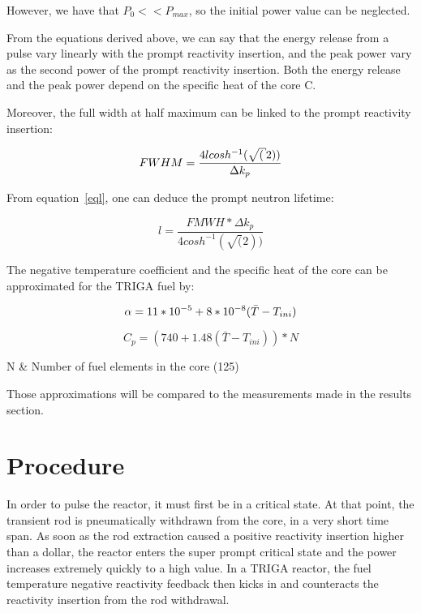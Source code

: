 However, we have that $P_0 << P_{max}$, so the initial power value can be neglected.

From the equations derived above, we can say that the energy release from a pulse vary linearly with the prompt reactivity insertion, and the peak power vary as the second power of the prompt reactivity insertion. Both the energy release and the peak power depend on the specific heat of the core C.

Moreover, the full width at half maximum can be linked to the prompt reactivity insertion:

\begin{equation}{\label{eql}}
FWHM = \frac{4l cosh^{-1}(\sqrt(2))}{\Delta k_p}
\end{equation}

From equation~\ref{eql}, one can deduce the prompt neutron lifetime:

\begin{equation}
l = \frac{FMWH * \Delta k_p}{4 cosh^{-1}(\sqrt(2))}
\end{equation}

The negative temperature coefficient and the specific heat of the core can be approximated for the TRIGA fuel by:

\begin{equation}{\label{eqa}}
\alpha = 11 * 10^{-5} + 8 * 10^{-8}(\bar{T}-T_{ini})
\end{equation}


\begin{equation}
C_p = (740 + 1.48 (\bar{T}-T_{ini})) * N
\end{equation}
\begin{conditions}
N & Number of fuel elements in the core (125)
\end{conditions}

Those approximations will be compared to the measurements made in the results section.

\section{Procedure}

In order to pulse the reactor, it must first be in a critical state. At that point, the transient rod is pneumatically withdrawn from the core, in a very short time span. As soon as the rod extraction caused a positive reactivity insertion higher than a dollar, the reactor enters the super prompt critical state and the power increases extremely quickly to a high value. In a TRIGA reactor, the fuel temperature negative reactivity feedback then kicks in and counteracts the reactivity insertion from the rod withdrawal.

